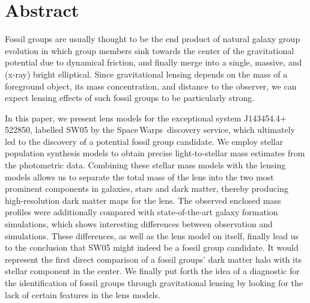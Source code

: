 
\clearpage

\newcommand{\SW}{Space\,Warps\xspace}
\def\pwidth{.99\textwidth}
\def\qwidth{.49\textwidth}
\def\qqwidth{.57\textwidth}

\section*{Abstract}
\noindent Fossil groups are usually thought to be the end product of natural
galaxy group evolution in which group members sink towards the center of the
gravitational potential due to dynamical friction, and finally merge into a
single, massive, and (x-ray) bright elliptical.  Since gravitational lensing
depends on the mass of a foreground object, its mass concentration, and distance
to the observer, we can expect lensing effects of such fossil groups to be
particularly strong.

\noindent In this paper, we present lens models for the exceptional system
J143454.4$+$522850, labelled SW05 by the \SW~discovery service, which ultimately
led to the discovery of a potential fossil group candidate.  We employ stellar
population synthesis models to obtain precise light-to-stellar mass estimates
from the photometric data.  Combining these stellar mass models with the lensing
models allows us to separate the total mass of the lens into the two most
prominent components in galaxies, stars and dark matter, thereby producing
high-resolution dark matter maps for the lens.  The observed enclosed mass
profiles were additionally compared with state-of-the-art galaxy formation
simulations, which shows interesting differences between observation and
simulations.  These differences, as well as the lens model on itself, finally
lead us to the conclusion that SW05 might indeed be a fossil group candidate.
It would represent the first direct comparison of a fossil groups' dark matter
halo with its stellar component in the center.  We finally put forth the idea of
a diagnostic for the identification of fossil groups through gravitational
lensing by looking for the lack of certain features in the lens models.
%

\clearpage
  

  

  

  

  


